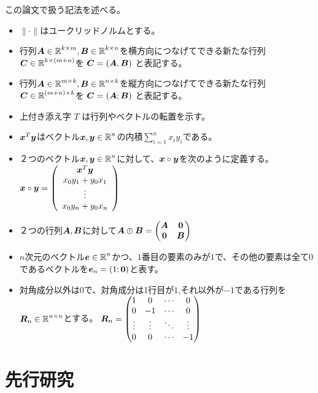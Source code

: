 \documentclass[11pt,a4paper,dvipdfmx,titlepage,uplatex]{jsarticle}
\theoremstyle{mystyle}
\newcommand{\0}{\mathbf{0}}
\def\0{\mbox{\bf 0}}
\def\e{\mbox{\boldmath $e$}}
\def\x{\mbox{\boldmath $x$}}
\def\y{\mbox{\boldmath $y$}}
\def\A{\mbox{\boldmath $A$}}
\def\B{\mbox{\boldmath $B$}}
\def\C{\mbox{\boldmath $C$}}
\def\R{\mbox{\boldmath $R$}}
\def\Real{\mbox{$\mathbb{R}$}}
\begin{document}
この論文で扱う記法を述べる。
\begin{itemize}
  \item $\|\cdot\|$はユークリッドノルムとする。
  \item 行列$\A \in \Real^{k \times m} , \B \in \Real^{k \times n}$を横方向につなげてできる新たな行列$\C \in \Real^{k \times (m+n)}$を
  $ \C = (\A, \B)$ と表記する。
  \item 行列$\A \in \Real^{m \times k} , \B \in \Real^{n \times k}$を縦方向につなげてできる新たな行列$\C \in \Real^{(m+n) \times k}$を
$    \C = (\A ; \B)$ と表記する。
  \item 上付き添え字 $T$ は行列やベクトルの転置を示す。
  \item $\x^T \y$はベクトル$\x,\y \in \Real^n$の内積$\sum_{i=1}^n x_i y_i$である。
  \item ２つのベクトル$\x , \y \in \Real^n$に対して、$\x \circ \y$を次のように定義する。\\
$\x \circ \y = \left(
  \begin{array}{c}
    \x^T \y \\
    x_0 y_1 + y_0 x_1 \\
    \vdots \\
    x_0 y_n + y_0 x_n
  \end{array} \right)
  $
  \item ２つの行列$\A , \B$に対して$\A \oplus \B =
  \begin{pmatrix}
    \A & \0 \\
    \0 & \B \\
  \end{pmatrix}$
  \item $n$次元のベクトル$\e \in \Real^n$かつ、$1$番目の要素のみが$1$で、その他の要素は全て$0$であるベクトルを$\e_n = (1 ; \0)$と表す。
  \item 対角成分以外は0で、対角成分は1行目が$1$,それ以外が$-1$である行列を$\R_n \in \Real^{n \times n}$とする。
  $
  \R_n =
  \begin{pmatrix}
    1 & 0 & \cdots & 0 \\
    0 & -1 & \cdots & 0 \\
    \vdots & \vdots & \ddots & \vdots \\
    0 & 0 & \cdots & -1 \\
  \end{pmatrix}
  $
\end{itemize}

\clearpage

\section{先行研究}\label{sec:preliminaries}
\end{document}
